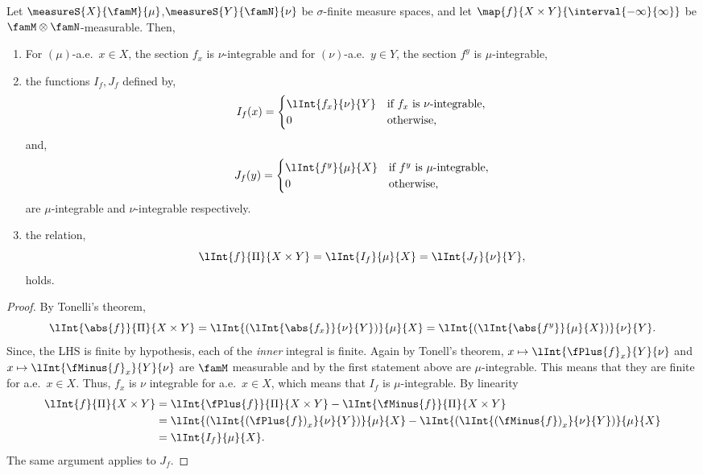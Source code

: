 \begin{Theorem}[name=Fubini's Theorem]\label{thm:fubini_thm}
    Let $\measureS{X}{\famM}{\mu}$,$\measureS{Y}{\famN}{\nu}$ be $\sigma$-finite measure spaces, and let
    $\map{f}{X\times Y}{\interval{-\infty}{\infty}}$ be $\famM\otimes\famN$-measurable. Then,
    \begin{enumerate}
	\item
	    For $(\mu)$-a.e.~$x\in X$, the section $f_x$ is $\nu$-integrable and for $(\nu)$-a.e.~$y\in Y$,
	    the section $f^{y}$ is $\mu$-integrable,
	\item
	    the functions $I_f,J_f$ defined by,
	    \begin{equation*}
		I_f(x) = 
		\begin{cases}
		    \lInt{f_x}{\nu}{Y} & \text{if $f_x$ is $\nu$-integrable}, \\
		    0 & \text{otherwise},
		\end{cases}
	    \end{equation*}
	    and,
	    \begin{equation*}
		J_f(y) = 
		\begin{cases}
		    \lInt{f^{y}}{\mu}{X} & \text{if $f^{y}$ is $\mu$-integrable}, \\
		    0 & \text{otherwise},
		\end{cases}
	    \end{equation*}
	    are $\mu$-integrable and $\nu$-integrable respectively.
	\item
	    the relation,
	    \[\lInt{f}{\Pi}{X\times Y} = \lInt{I_f}{\mu}{X} = \lInt{J_f}{\nu}{Y},\]
	    holds.
    \end{enumerate}
\end{Theorem}
\begin{proof}
    By Tonelli's theorem,
    \[\lInt{\abs{f}}{\Pi}{X\times Y} = \lInt{\left(\lInt{\abs{f_x}}{\nu}{Y}\right)}{\mu}{X}
	= \lInt{\left(\lInt{\abs{f^{y}}}{\mu}{X}\right)}{\nu}{Y}.\]
    Since, the LHS is finite by hypothesis, each of the \emph{inner} integral is finite.
    Again by Tonell's theorem, 
    $x\mapsto\lInt{\fPlus{f}_x}{Y}{\nu}$ and $x\mapsto\lInt{\fMinus{f}_x}{Y}{\nu}$ are $\famM$ measurable and
    by the first statement above are $\mu$-integrable. This means that they are finite for a.e.~$x \in X$.
    Thus, $f_x$ is $\nu$ integrable for a.e.~$x\in X$, which means that $I_f$ is $\mu$-integrable.
    By linearity
    \begin{align*}
	\lInt{f}{\Pi}{X\times Y} &= \lInt{\fPlus{f}}{\Pi}{X \times Y} - \lInt{\fMinus{f}}{\Pi}{X \times Y} \\
	& = \lInt{\left(\lInt{{(\fPlus{f})}_{x}}{\nu}{Y}\right)}{\mu}{X} 
	- \lInt{\left(\lInt{{(\fMinus{f})}_{x}}{\nu}{Y}\right)}{\mu}{X} \\
	& = \lInt{I_f}{\mu}{X}.
    \end{align*}
    The same argument applies to $J_f$.

\end{proof}
